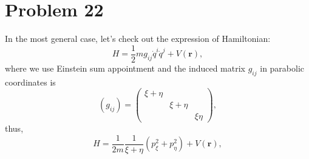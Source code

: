 \section*{Problem 22}

In the most general case, let's check out the expression of Hamiltonian:
\begin{equation*}
    H = \frac{1}{2} m g_{ij} \dot{q}^i \dot{q}^j  +  V\left(\boldsymbol{r}\right),
\end{equation*}
where we use Einstein sum appointment and the induced matrix $g_{ij}$ in parabolic coordinates is
\begin{equation}
    \left(g_{ij}\right)  = \left(
    \begin{matrix}
        \xi + \eta  &               &           \\
                    & \xi + \eta    &           \\
                    &               &  \xi\eta
    \end{matrix}
    \right),
\end{equation}
thus,
\begin{equation}
    H = \frac{1}{2m} \frac{1}{\xi+\eta} \left( p_\xi^2 + p_\eta^2 \right)  +  V\left(\boldsymbol{r}\right),
\end{equation}